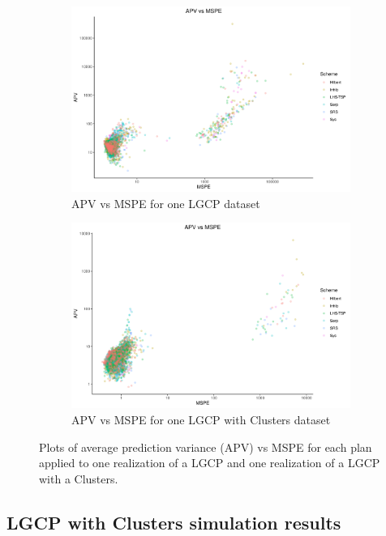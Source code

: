 \documentclass[review]{elsarticle}
\begin{document}
\begin{figure}

\begin{subfigure}{5in}
\includegraphics[width=5in]{../graphics/APV-MSPE-LGCP000004.png}
\caption{APV vs MSPE for one LGCP dataset}
\label{apvlgcp}
\end{subfigure}

\begin{subfigure}{5in}
\includegraphics[width=5in]{../graphics/APV-MSPE-Cluster000004.png}
\caption{APV vs MSPE for one LGCP with Clusters dataset}
\label{apvcluster}
\end{subfigure}

\caption{Plots of average prediction variance (APV) vs MSPE for each plan
applied to one realization of a LGCP and one realization of a LGCP with a
Clusters.}
\label{apvresults}
\end{figure}


\subsection{LGCP with Clusters simulation results}
\end{document}
